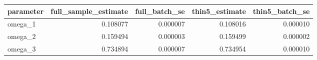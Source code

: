 \begin{tabular}{lrrrr}
\toprule
parameter & full\_sample\_estimate & full\_batch\_se & thin5\_estimate & thin5\_batch\_se \\
\midrule
omega\_1 & 0.108077 & 0.000007 & 0.108016 & 0.000010 \\
omega\_2 & 0.159494 & 0.000003 & 0.159499 & 0.000002 \\
omega\_3 & 0.734894 & 0.000007 & 0.734954 & 0.000010 \\
\bottomrule
\end{tabular}

